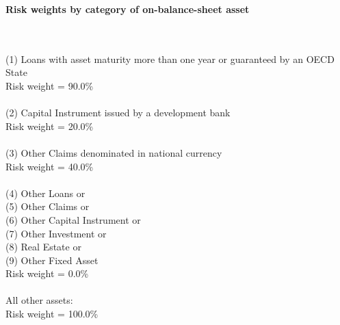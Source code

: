 \documentclass{article}
\begin{document}
\setlength{\parindent}{0em}
\begin{center}{\bf Risk weights by category of on-balance-sheet asset}\end{center}
~\\
~\\

(1) Loans with asset maturity more than one year or guaranteed by an OECD State \\
Risk weight = 90.0\%\\

~\\
(2) Capital Instrument issued by a development bank \\
Risk weight = 20.0\%\\

~\\
(3) Other Claims denominated in national currency \\
Risk weight = 40.0\%\\

~\\
(4) Other Loans or \\
(5) Other Claims or \\
(6) Other Capital Instrument or \\
(7) Other Investment or \\
(8) Real Estate or \\
(9) Other Fixed Asset\\
Risk weight = 0.0\%\\

~\\
All other assets:\\
Risk weight = 100.0\%\\

~\\
\end{document}
